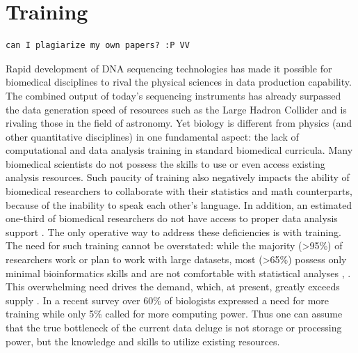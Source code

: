 \section{Training}
\begin{verbatim}can I plagiarize my own papers? :P VV\end{verbatim}
Rapid development of DNA sequencing technologies has made it possible for biomedical disciplines to rival the physical sciences in data production capability. The combined output of today’s sequencing instruments has already surpassed the data generation speed of resources such as the Large Hadron Collider and is rivaling those in the field of astronomy. Yet biology is different from physics (and other quantitative disciplines) in one fundamental aspect: the lack of computational and data analysis training in standard biomedical curricula. Many biomedical scientists do not possess the skills to use or even access existing analysis resources.
Such paucity of training also negatively impacts the ability of biomedical researchers to collaborate with their statistics and math counterparts, because of the inability to speak each other’s language. In addition, an estimated one-third of biomedical researchers do not have access to proper data analysis support \cite{larcombe2017elixir}. The only operative way to address these deficiencies is with training. The need for such training cannot be overstated: while the majority (>95\%) of researchers work or plan to work with large datasets, most (>65\%) possess only minimal bioinformatics skills and are not comfortable with statistical analyses \cite{larcombe2017elixir}, \cite{williams2017vision}.
This overwhelming need drives the demand, which, at present, greatly exceeds supply \cite{attwood2017global}. In a recent survey \cite{survey2013embl} over 60\% of biologists expressed a need for more training while only 5\% called for more computing power. Thus one can assume that the true bottleneck of the current data deluge is not storage or processing power, but the knowledge and skills to utilize existing resources.


